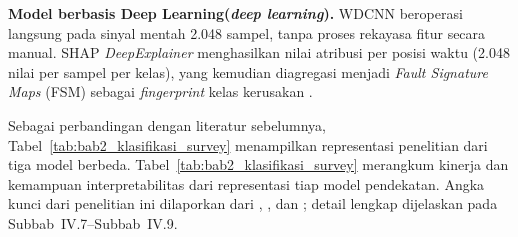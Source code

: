 \textbf{Model berbasis Deep Learning(\emph{deep learning}).} WDCNN beroperasi langsung pada
sinyal mentah 2.048 sampel, tanpa proses rekayasa fitur secara manual. SHAP \emph{DeepExplainer}
menghasilkan nilai atribusi per posisi waktu (2.048 nilai per sampel per kelas),
yang kemudian diagregasi menjadi \emph{Fault Signature Maps} (FSM) sebagai
\emph{fingerprint} kelas kerusakan .

{\color{blue}Sebagai perbandingan dengan literatur sebelumnya,
Tabel~\ref{tab:bab2_klasifikasi_survey} menampilkan representasi penelitian dari tiga model berbeda.}
Tabel~\ref{tab:bab2_klasifikasi_survey} merangkum kinerja dan kemampuan
interpretabilitas dari representasi tiap model pendekatan. {\color{blue}Angka kunci
dari penelitian ini} dilaporkan dari
, ,
dan ; detail lengkap dijelaskan pada
Subbab~IV.7--Subbab~IV.9.

